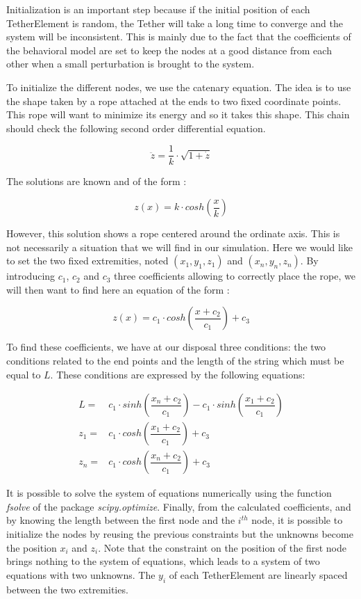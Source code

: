 Initialization is an important step because if the initial position of each TetherElement is random, the Tether will take a long time to converge and the system will be inconsistent. This is mainly due to the fact that the coefficients of the behavioral model are set to keep the nodes at a good distance from each other when a small perturbation is brought to the system.

To initialize the different nodes, we use the catenary equation. The idea is to use the shape taken by a rope attached at the ends to two fixed coordinate points. This rope will want to minimize its energy and so it takes this shape. This chain should check the following second order differential equation.

$$\ddot{z} = \frac{1}{k} \cdot \sqrt{1 + \dot{z}}$$

The solutions are known and of the form :

$$z(x) = k \cdot cosh\left(\frac{x}{k}\right)$$

However, this solution shows a rope centered around the ordinate axis. This is not necessarily a situation that we will find in our simulation. Here we would like to set the two fixed extremities, noted $(x_1, y_1, z_1)$ and $(x_n, y_n, z_n)$. By introducing $c_1$, $c_2$ and $c_3$ three coefficients allowing to correctly place the rope, we will then want to find here an equation of the form :

$$z(x) = c_1 \cdot cosh\left(\frac{x+c_2}{c_1}\right)+c_3$$

To find these coefficients, we have at our disposal three conditions: the two conditions related to the end points and the length of the string which must be equal to $L$. These conditions are expressed by the following equations:

\begin{align*}
    L = & c_1 \cdot sinh\left(\dfrac{x_n+c_2}{c_1}\right) - c_1 \cdot sinh\left(\dfrac{x_1+c_2}{c_1}\right) \\
    z_1 = & c_1 \cdot cosh\left(\dfrac{x_1+c_2}{c_1}\right)+c_3 \\
    z_n = & c_1 \cdot cosh\left(\dfrac{x_n+c_2}{c_1}\right)+c_3
\end{align*}

It is possible to solve the system of equations numerically using the function \textit{fsolve} of the package \textit{scipy.optimize}. Finally, from the calculated coefficients, and by knowing the length between the first node and the $i^{th}$ node, it is possible to initialize the nodes by reusing the previous constraints but the unknowns become the position $x_i$ and $z_i$. Note that the constraint on the position of the first node brings nothing to the system of equations, which leads to a system of two equations with two unknowns. The $y_i$ of each TetherElement are linearly spaced between the two extremities.